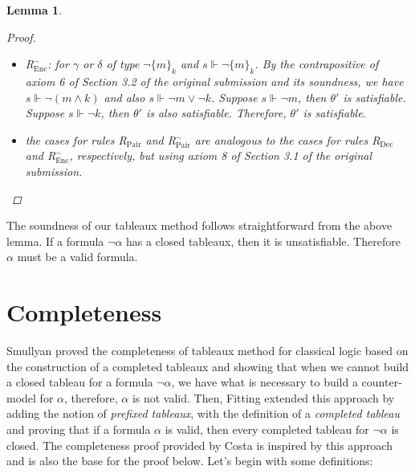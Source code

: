\documentclass[submission,copyright,creativecommons]{eptcs}
\newtheorem{lemma}[definition]{Lemma}
\begin{document}
\begin{lemma}
\begin{proof}
\begin{itemize}
                \item R$_\text{Enc}^\neg$: for $\gamma$ or $\delta$ of type $\neg \{m\}_k$ and $s \Vdash \neg  \{m\}_k$. By the contrapositive of axiom 6 of Section 3.2 of the original submission and its soundness, we have $s \Vdash \neg (m \land k)$ and also $s \Vdash \neg m \lor  \neg k$. Suppose $s \Vdash \neg m $, then $\theta'$ is satisfiable. Suppose $s \Vdash \neg k $, then $\theta'$ is also satisfiable. Therefore, $\theta'$ is satisfiable.
                
                \item the cases for rules R$_\text{Pair}$ and R$_\text{Pair}^\neg$ are analogous to the cases for rules R$_\text{Dec}$ and R$_\text{Enc}^\neg$, respectively, but using axiom 8 of Section 3.1 of the original submission.
            \end{itemize} \end{proof}\end{lemma}
        
        The soundness of our tableaux method follows straightforward from the above lemma. If a formula $\neg \alpha$ has a closed tableaux, then it is unsatisfiable. Therefore $\alpha$ must be a valid formula.
        
        
        
    \section{Completeness}
        \label{sec:dymaelTableauxCompleteness}
    
        Smullyan \cite{smullyan1968fol} proved the completeness of tableaux method for classical logic based on the construction of a completed tableaux and showing that when we cannot build a closed tableau for a formula $\neg \alpha$, we have what is necessary to build a counter-model for $\alpha$, therefore, $\alpha$ is not valid. Then, Fitting \cite{fitting1986proofmethods} extended this approach by adding the notion of \emph{prefixed tableaux}, with the definition of a \emph{completed tableau} and proving that if a formula $\alpha$ is valid, then every completed tableau for $\neg \alpha$ is closed. The completeness proof provided by Costa \cite{IntroducaoLogicaModalAplicadaComputacao} is inspired by this approach and is also the base for the proof below.
        Let's begin with some definitions:
        
\end{document}
